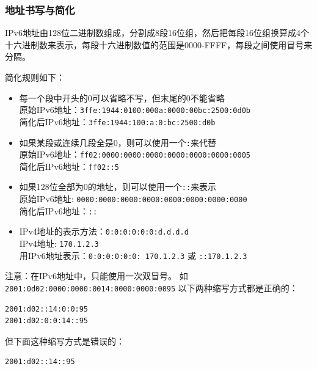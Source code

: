 \subsubsection{地址书写与简化}
IPv6地址由128位二进制数组成，分割成8段16位组，然后把每段16位组换算成4个十六进制数来表示，每段十六进制数值的范围是0000-FFFF，每段之间使用冒号来分隔。

简化规则如下：
\begin{itemize}
\item 每一个段中开头的0可以省略不写，但末尾的0不能省略\\
原始IPv6地址：\verb'3ffe:1944:0100:000a:0000:00bc:2500:0d0b'\\
简化后IPv6地址：\verb'3ffe:1944:100:a:0:bc:2500:d0b'
\item 如果某段或连续几段全是0，则可以使用一个\verb':'来代替\\
原始IPv6地址：\verb'ff02:0000:0000:0000:0000:0000:0000:0005'\\
简化后IPv6地址：\verb'ff02::5'
\item 如果128位全部为0的地址，则可以使用一个\verb'::'来表示\\
原始IPv6地址: \verb'0000:0000:0000:0000:0000:0000:0000:0000'\\
简化后IPv6地址：\verb'::'
\item IPv4地址的表示方法：\verb'0:0:0:0:0:0:d.d.d.d'\\
IPv4地址: \verb'170.1.2.3'\\
用IPv6地址表示：\verb'0:0:0:0:0:0: 170.1.2.3' 或 \verb'::170.1.2.3'
\end{itemize}
注意：在IPv6地址中，只能使用一次双冒号。
如\verb'2001:0d02:0000:0000:0014:0000:0000:0095'
以下两种缩写方式都是正确的：
\begin{lstlisting}
2001:d02::14:0:0:95
2001:d02:0:0:14::95
\end{lstlisting}
但下面这种缩写方式是错误的：
\begin{lstlisting}
2001:d02::14::95
\end{lstlisting}

